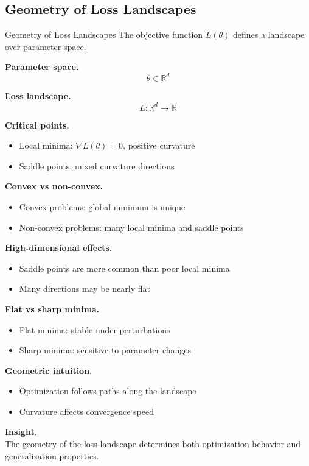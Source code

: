 \documentclass[aspectratio=169,11pt]{beamer}
\begin{document}
\subsection{Geometry of Loss Landscapes}
\begin{frame}[t,allowframebreaks]{Geometry of Loss Landscapes}
\small
The objective function $L(\theta)$ defines a landscape over parameter space.

\textbf{Parameter space.}\\ \[
\theta \in \mathbb{R}^d
\]

\textbf{Loss landscape.}\\ \[
L : \mathbb{R}^d \to \mathbb{R}
\]

\textbf{Critical points.}\\ \begin{itemize}
    \item Local minima: $\nabla L(\theta) = 0$, positive curvature
    \item Saddle points: mixed curvature directions
\end{itemize}

\textbf{Convex vs non-convex.}\\ \begin{itemize}
    \item Convex problems: global minimum is unique
    \item Non-convex problems: many local minima and saddle points
\end{itemize}

\textbf{High-dimensional effects.}\\ \begin{itemize}
    \item Saddle points are more common than poor local minima
    \item Many directions may be nearly flat
\end{itemize}

\textbf{Flat vs sharp minima.}\\ \begin{itemize}
    \item Flat minima: stable under perturbations
    \item Sharp minima: sensitive to parameter changes
\end{itemize}

\textbf{Geometric intuition.}\\ \begin{itemize}
    \item Optimization follows paths along the landscape
    \item Curvature affects convergence speed
\end{itemize}

\textbf{Insight.}\\ The geometry of the loss landscape determines both optimization behavior and generalization properties.
\end{frame}
\end{document}
